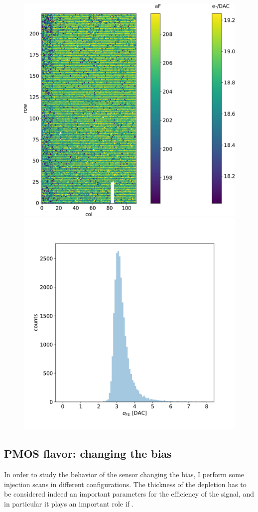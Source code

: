         \begin{figure}[h!]
            \centering
            \includegraphics[width=.49\linewidth]{figures/charaterization/conversion_factor_map.pdf}
            \includegraphics[width=.49\linewidth]{figures/charaterization/Fe_width_DAC_hist.pdf}            
            \label{fig:}
            \caption{}
        \end{figure}         



    \subsection{PMOS flavor: changing the bias}\label{chap:characterization_section:bias}
    In order to study the behavior of the sensor changing the bias, I perform some injection scans in different configurations. 
    The thickness of the depletion has to be considered indeed an important parameters for the efficiency of the signal, and in particular it plays an important role if .

